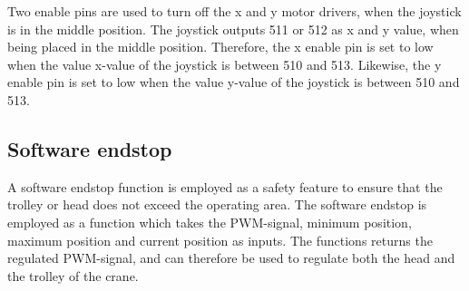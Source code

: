 Two enable pins are used to turn off the x and y motor drivers, when the joystick is in the middle position. The joystick outputs 511 or 512 as x and y value, when being placed in the middle position. Therefore, the x enable pin is set to low when the value x-value of the joystick is between 510 and 513. Likewise, the y enable pin is set to low when the value y-value of the joystick is between 510 and 513.

\subsection{Software endstop}

A software endstop function is employed as a safety feature to ensure that the trolley or head does not exceed the operating area. The software endstop is employed as a function which takes the PWM-signal, minimum position, maximum position and current position as inputs. The functions returns the regulated PWM-signal, and can therefore be used to regulate both the head and the trolley of the crane. 

